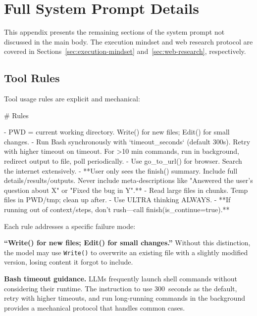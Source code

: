 \documentclass{article}
\begin{document}
\section{Full System Prompt Details}
\label{app:full-prompt}

This appendix presents the remaining sections of the system prompt not discussed in the main body.  The execution mindset and web research protocol are covered in Sections~\ref{sec:execution-mindset} and~\ref{sec:web-research}, respectively.

\subsection{Tool Rules}
\label{app:tool-rules}

Tool usage rules are explicit and mechanical:

\begin{prompt}
# Rules

- PWD = current working directory. Write() for new files; Edit() for small changes.
- Run Bash synchronously with `timeout_seconds` (default 300s). Retry with higher timeout on timeout. For >10 min commands, run in background, redirect output to file, poll periodically.
- Use go_to_url() for browser. Search the internet extensively.
- **User only sees the finish() summary. Include full details/results/outputs. Never include meta-descriptions like "Answered the user's question about X" or "Fixed the bug in Y".**
- Read large files in chunks. Temp files in PWD/tmp; clean up after.
- Use ULTRA thinking ALWAYS.
- **If running out of context/steps, don't rush---call finish(is_continue=true).**
\end{prompt}

Each rule addresses a specific failure mode:

\textbf{``Write() for new files; Edit() for small changes.''}  Without this distinction, the model may use \texttt{Write()} to overwrite an existing file with a slightly modified version, losing content it forgot to include.

\textbf{Bash timeout guidance.}  LLMs frequently launch shell commands without considering their runtime.  The instruction to use 300~seconds as the default, retry with higher timeouts, and run long-running commands in the background provides a mechanical protocol that handles common cases.
\end{document}

